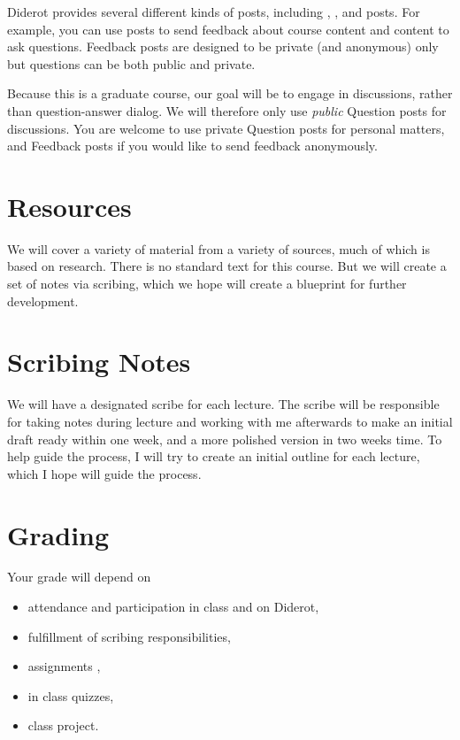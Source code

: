 \begin{gram}
Diderot provides several different kinds of posts, including , , and  posts.
%
For example, you can use  posts to send feedback about course content and  content to ask questions.
%
Feedback posts are designed to be private (and anonymous) only but questions can be both public and private.
%

Because this is a graduate course, our goal will be to engage in discussions, rather than question-answer dialog.
%
We will therefore only use \emph{public} Question posts for discussions.
%
You are welcome to use private Question posts for personal matters, and Feedback posts if you would like to send feedback anonymously. 
\end{gram}

\section{Resources}

We will cover a variety of material from a variety of sources, much of which is based on research.
%
There is no standard text for this course.
%
But we will create a set of notes via scribing, which we hope will create a blueprint for further development.


\section{Scribing Notes}

We will have a  designated scribe for each lecture.
%
The scribe will be responsible for taking notes during lecture and working with me afterwards to make an initial draft ready within one week, and a more polished version in two weeks time.
%
To help guide the process, I will try to create an initial outline for each lecture, which I hope will guide the process.

\section{Grading}

Your grade will depend on 
\begin{itemize}
\item attendance and participation in class and on Diderot,
\item fulfillment of scribing responsibilities,
\item assignments ,
\item in class quizzes,
\item class project.
\end{itemize}


